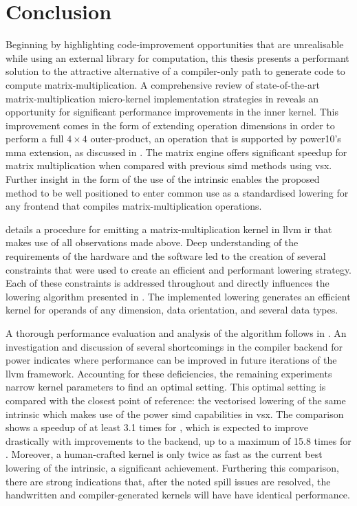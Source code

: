 \documentclass[\main/thesis.tex]{subfiles}
\begin{document}
\chapter{Conclusion}
\label{cha:conclusion}
Beginning by highlighting code-improvement opportunities that are unrealisable while using an external library for computation, this thesis presents a performant solution to the attractive alternative of a compiler-only path to generate code to compute matrix-multiplication.
A comprehensive review of state-of-the-art matrix-multiplication micro-kernel implementation strategies in  reveals an opportunity for significant performance improvements in the inner kernel.
This improvement comes in the form of extending operation dimensions in order to perform a full $4 \times 4$ outer-product, an operation that is supported by \gls{power10}'s \gls{mma} extension, as discussed in .
The \gls{matrix engine} offers significant speedup for matrix multiplication when compared with previous \gls{simd} methods using \gls{vsx}.
Further insight in the form of the use of the  \gls{intrinsic} enables the proposed method to be well positioned to enter common use as a standardised \gls{lowering} for any frontend that compiles matrix-multiplication operations.

 details a procedure for emitting a matrix-multiplication kernel in \gls{llvm} \gls{ir} that makes use of all observations made above.
Deep understanding of the requirements of the hardware and the software led to the creation of several constraints that were used to create an efficient and performant \gls{lowering} strategy.
Each of these constraints is addressed throughout  and directly influences the \gls{lowering} algorithm presented in .
The implemented lowering generates an efficient kernel for operands of any dimension, data orientation, and several data types.

A thorough performance evaluation and analysis of the algorithm follows in .
An investigation and discussion of several shortcomings in the compiler backend for \gls{power} indicates where performance can be improved in future iterations of the \gls{llvm} framework.
Accounting for these deficiencies, the remaining experiments narrow kernel parameters to find an optimal setting.
This optimal setting is compared with the closest point of reference: the vectorised lowering of the same \gls{intrinsic} which makes use of the \gls{power}  \gls{simd} capabilities in \gls{vsx}.
The comparison shows a speedup of at least 3.1 times for , which is expected to improve drastically with improvements to the backend, up to a maximum of 15.8 times for .
Moreover, a human-crafted kernel is only twice as fast as the current best \gls{lowering} of the  \gls{intrinsic}, a significant achievement.
Furthering this comparison, there are strong indications that, after the noted \gls{spill} issues are resolved, the handwritten and compiler-generated kernels will have have identical performance.
\end{document}
